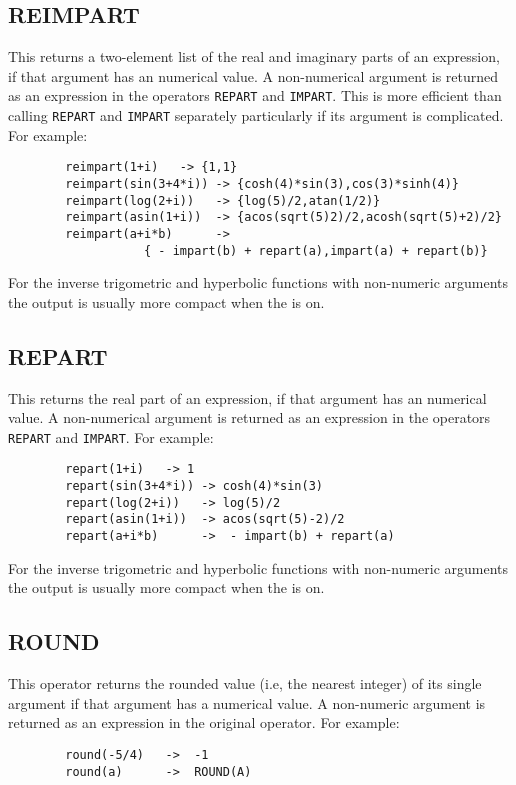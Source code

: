 \subsection{REIMPART}
\hypertarget{operator:REIMPART}{}
This returns a two-element list of the real and imaginary parts of an
expression, if that argument has an
numerical value.  A non-numerical argument is returned as an expression in
the operators \texttt{REPART} and \texttt{IMPART}.
This is more efficient than calling \texttt{REPART} and \texttt{IMPART}
separately particularly if its argument is complicated.
For example:
\begin{verbatim}
        reimpart(1+i)   -> {1,1}
        reimpart(sin(3+4*i)) -> {cosh(4)*sin(3),cos(3)*sinh(4)}
        reimpart(log(2+i))   -> {log(5)/2,atan(1/2)}
        reimpart(asin(1+i))  -> {acos(sqrt(5)2)/2,acosh(sqrt(5)+2)/2}
        reimpart(a+i*b)      -> 
                   { - impart(b) + repart(a),impart(a) + repart(b)}
\end{verbatim}

For the inverse trigometric and hyperbolic functions with non-numeric arguments the output is usually more compact when the  is on.

\subsection{REPART}
\hypertarget{operator:REPART}{}
This returns the real part of an expression, if that argument has an
numerical value.  A non-numerical argument is returned as an expression in
the operators \texttt{REPART} and \texttt{IMPART}.  
For example:
\begin{verbatim}
        repart(1+i)   -> 1
        repart(sin(3+4*i)) -> cosh(4)*sin(3)
        repart(log(2+i))   -> log(5)/2
        repart(asin(1+i))  -> acos(sqrt(5)-2)/2         
        repart(a+i*b)      ->  - impart(b) + repart(a)
\end{verbatim}

For the inverse trigometric and hyperbolic functions with non-numeric arguments the output is usually more compact when the  is on.

\subsection{ROUND}
\hypertarget{operator:ROUND}{}
This operator returns the rounded value (i.e, the nearest integer) of its
single argument if that argument has a numerical value.  A non-numeric
argument is returned as an expression in the original operator.  For
example:
\begin{verbatim}
        round(-5/4)   ->  -1
        round(a)      ->  ROUND(A)
\end{verbatim}

